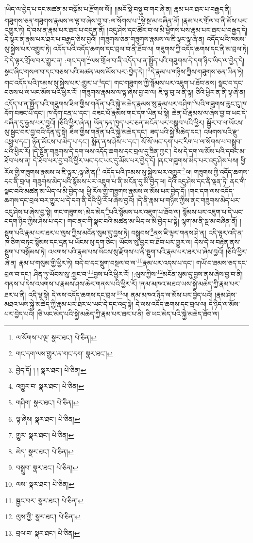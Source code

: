 །ཡིད་ལ་བྱེད་པ་དང་མཚན་མ་བསྒོམ་པ་རྫོགས་སོ།། །།མདོ་སྡེ་བསྡུ་བ་གང་ཞེ་ན། རྣམ་པར་ཐར་པ་བརྒྱད་ནི། གཟུགས་ཅན་གཟུགས་རྣམས་ལ་ལྟ་བ་ཞེས་བྱ་བ་:ལ་སོགས་པ་\footnote{ལ་སོགས་པ་ལྔ་  སྣར་ཐང་།  པེ་ཅིན། }སྟེ་སྔ་མ་བཞིན་ནོ། །རྣམ་པར་གྲོལ་བ་ནི་མོས་པར་འགྱུར་ཏེ། དེ་བས་ན་རྣམ་པར་ཐར་པ་བདུན་ནོ། །འདུ་ཤེས་དང་ཚོར་བ་ལ་མི་ཕྱོགས་པས་རྣམ་པར་ཐར་པ་བརྒྱད་དེ། དེ་ལྟར་ན་རྣམ་པར་ཐར་པ་བརྒྱད་ཅེས་བྱའོ། །གཟུགས་ཅན་གཟུགས་རྣམས་ལ་ཇི་ལྟར་ལྟ་ཞེ་ན། འདོད་པའི་ཁམས་སུ་སྐྱེས་པར་འགྱུར་ཏེ། འདོད་པའི་འདོད་ཆགས་དང་བྲལ་བ་ནི་ཐོབ་ལ། གཟུགས་ཀྱི་འདོད་ཆགས་དང་ནི་མ་བྲལ་ཏེ། དེ་དེ་ལྟར་གྲོལ་བར་གྱུར་ན། :གང་དག་\footnote{གང་དག་ལས་གྱུར་ན་གང་དག་  སྣར་ཐང་། }ལས་གྲོལ་བ་ནི་འདོད་པ་ན་སྤྱོད་པའི་གཟུགས་དེ་དག་ཉིད་ཡིད་ལ་བྱེད་དེ། སྣང་ཞིང་གསལ་བ་དང་བཅས་པའི་མཚན་མས་མོས་པར་:བྱེད་དེ། །\footnote{བྱེད་དོ། ། །  སྣར་ཐང་།  པེ་ཅིན། }དེ་རྣམ་པ་གཉིས་ཀྱིས་གཟུགས་ཅན་ཡིན་ཏེ། གང་འདོད་པའི་ཁམས་སུ་སྐྱེས་པར་:གྱུར་པ་\footnote{འགྱུར་བ་  སྣར་ཐང་།  པེ་ཅིན། }དང་། གང་གཟུགས་ཀྱི་སྙོམས་པར་འཇུག་པ་ཐོབ་ནས། སྣང་བ་དང་བཅས་པ་ལ་ཡང་མོས་པའི་ཕྱིར་རོ། །གཟུགས་རྣམས་ལ་ལྟ་ཞེས་བྱ་བ་ལ། ཇི་ལྟ་བུ་ལ་ནི་ལྟ། ཅིའི་ཕྱིར་ན་ནི་ལྟ་ཞེ་ན། འདོད་པ་ན་སྤྱོད་པའི་གཟུགས་ཟིལ་གྱིས་གནོན་པའི་སྐྱེ་མཆེད་རྣམས་སུ་རྣམ་པར་བཤིག་\footnote{གཤིག་  སྣར་ཐང་།  པེ་ཅིན། }པའི་གཟུགས་ཆུང་ངུ་ཁ་དོག་བཟང་པོ་དང་། ཁ་དོག་ངན་པ་དང་། བཟང་པོ་རྣམས་གང་དག་ཡིན་པ་སྟེ། ཆེན་པོ་རྣམས་ལ་ཞེས་བྱ་བ་ཡང་དེ་བཞིན་དུ་རྒྱས་པར་བྱའོ། །ཅིའི་ཕྱིར་ཞེ་ན། ཡོན་ཏན་ཁྱད་པར་ཅན་མངོན་པར་བསྒྲུབ་པའི་ཕྱིར། སྦྱོར་བ་ལ་ཡོངས་སུ་སྦྱང་བར་བྱ་བའི་དོན་དུ་སྟེ། ཟིལ་གྱིས་གནོན་པའི་སྐྱེ་མཆེད་དང་། ཟད་པའི་སྐྱེ་མཆེད་དང་། འཕགས་པའི་རྫུ་འཕྲུལ་དང་། ཉོན་མོངས་པ་མེད་པ་དང་། སྨོན་ནས་ཤེས་པ་དང་། སོ་སོ་ཡང་དག་པར་རིག་པ་ལ་སོགས་པ་བསྒྲུབ་པའི་ཕྱིར་རོ། །དེ་སྔོན་གཟུགས་དེ་དག་ལས་འདོད་ཆགས་དང་བྲལ་དུ་ཟིན་ཀྱང་། དེས་དེ་དག་ལ་མོས་པའི་དབང་མ་ཐོབ་པས་ན། དེ་ཐོབ་པར་བྱ་བའི་ཕྱིར་ཡང་དང་ཡང་དུ་མོས་པར་བྱེད་དོ། །ནང་གཟུགས་མེད་པར་འདུ་ཤེས་པས། ཕྱི་རོལ་གྱི་གཟུགས་རྣམས་ལ་ཇི་ལྟར་:ལྟ་ཞེ་ན།\footnote{ལྟ་ཞེས།  སྣར་ཐང་།  པེ་ཅིན། } འདོད་པའི་ཁམས་སུ་སྐྱེས་པར་འགྱུར་\footnote{གྱུར་  སྣར་ཐང་།  པེ་ཅིན། }ལ། གཟུགས་ཀྱི་འདོད་ཆགས་དང་ནི་བྲལ། གཟུགས་མེད་པའི་སྙོམས་པར་འཇུག་པ་ནི་མངོན་དུ་མི་བྱེད་ལ། དེའི་འདུ་ཤེས་དང་ནི་ལྡན་ཏེ། ནང་གི་སྣང་བའི་མཚན་མ་ཡིད་ལ་མི་བྱེད་ལ། ཕྱི་རོལ་གྱི་གཟུགས་རྣམས་ལ་མོས་པར་བྱེད་དོ། །གང་དག་ལས་འདོད་ཆགས་དང་བྲལ་བར་གྱུར་པ་དེ་དག་ནི་དེའི་ཕྱི་རོལ་ཞེས་བྱའོ། །དེ་ནི་རྣམ་པ་གཉིས་ཀྱིས་ནང་གཟུགས་མེད་པར་འདུ་ཤེས་པ་ཞེས་བྱ་སྟེ། གང་གཟུགས་:མེད་མེད་\footnote{མེད་  སྣར་ཐང་།  པེ་ཅིན། }པའི་སྙོམས་པར་འཇུག་པ་ཐོབ་ལ། སྙོམས་པར་འཇུག་པ་དེ་ཡང་བདག་ཉིད་ཀྱིས་ཤེས་པ་དང་། གང་ནང་གི་སྣང་བའི་མཚན་མ་ཡིད་ལ་མི་བྱེད་པ་སྟེ། ལྷག་མ་ནི་སྔ་མ་བཞིན་ནོ། །སྡུག་པའི་རྣམ་པར་ཐར་པ་ལུས་ཀྱིས་མངོན་སུམ་དུ་བྱས་ཏེ། བསྒྲུབས་\footnote{བསྒྲུབ་  སྣར་ཐང་།  པེ་ཅིན། }ནས་ཇི་ལྟར་གནས་ཤེ་ན། འདི་ལྟར་འདི་ན་ཁ་ཅིག་བཏང་སྙོམས་དང་དྲན་པ་ཡོངས་སུ་དག་ཅིང་། ཡོངས་སུ་བྱང་བ་ཐོབ་པར་གྱུར་ལ། དེས་དེ་ལ་བརྟེན་ནས་སྡུག་པ་བསྒོམས་ཏེ། འཕགས་པའི་རྣམ་པས་ཡོངས་སུ་རྫོགས་པ་ནི་སྡུག་པའི་རྣམ་པར་ཐར་པ་ཞེས་བྱའོ། །ཅིའི་ཕྱིར་ཞེ་ན། རྣམ་པ་གསུམ་གྱི་ཕྱིར་ཏེ། བདེ་བ་དང་སྡུག་བསྔལ་བ་ལ་\footnote{ལས་  སྣར་ཐང་།  པེ་ཅིན། }རྣམ་པར་འདས་པ་དང་། གཡོ་བ་ཐམས་ཅད་དང་བྲལ་བ་དང་། ཤིན་ཏུ་ཡོངས་སུ་:སྦྱང་བ་\footnote{སྦྱང་བར་  སྣར་ཐང་།  པེ་ཅིན། }བྱས་པའི་ཕྱིར་རོ། །:ལུས་ཀྱིས་\footnote{ལུས་ཀྱི་  སྣར་ཐང་།  པེ་ཅིན། }མངོན་སུམ་དུ་བྱས་ནས་ཞེས་བྱ་བ་ནི། གནས་པ་དེས་འཕགས་པ་རྣམས་ཤས་ཆེར་གནས་པའི་ཕྱིར་རོ། །ནམ་མཁའ་མཐའ་ཡས་སྐྱེ་མཆེད་ཀྱི་རྣམ་པར་ཐར་པ་ནི། འདི་ལྟ་སྟེ། དེ་ལས་འདོད་ཆགས་དང་བྲལ་\footnote{བྲལ་བ་  སྣར་ཐང་།  པེ་ཅིན། }ལ། ནམ་མཁའ་ཉིད་ལ་མོས་པར་བྱེད་པའོ། །རྣམ་ཤེས་མཐའ་ཡས་སྐྱེ་མཆེད་ཀྱི་རྣམ་པར་ཐར་པ་ཡང་དེ་དང་འདྲ་སྟེ། དེ་ལས་འདོད་ཆགས་དང་བྲལ་ལ། དེ་ཉིད་ལ་མོས་པར་བྱེད་པའོ། །ཅི་ཡང་མེད་པའི་སྐྱེ་མཆེད་ཀྱི་རྣམ་པར་ཐར་པ་ནི། ཅི་ཡང་མེད་པའི་སྐྱེ་མཆེད་ཐོབ་ལ། 